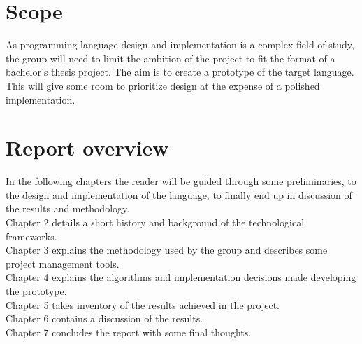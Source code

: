 \section{Scope}

As programming language design and implementation is a complex field of study, the group will need to limit the ambition of the project to fit the format of a bachelor's thesis project. The aim is to create a prototype of the target language. This will give some room to prioritize design at the expense of a polished implementation.

\section{Report overview}

In the following chapters the reader will be guided through some preliminaries, to the design and implementation of the language, to finally end up in discussion of the results and methodology.\\[0.5cm]
Chapter 2 details a short history and background of the technological frameworks. \\
Chapter 3 explains the methodology used by the group and describes some project management tools. \\
Chapter 4 explains the algorithms and implementation decisions made developing the prototype. \\
Chapter 5 takes inventory of the results achieved in the project. \\
Chapter 6 contains a discussion of the results. \\
Chapter 7 concludes the report with some final thoughts.
